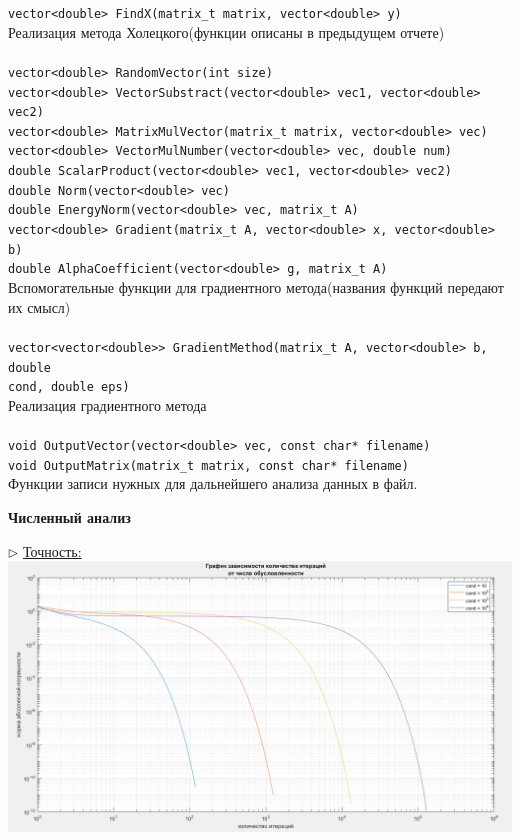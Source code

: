 \documentclass{article}
\begin{document}
	\verb|vector<double> FindX(matrix_t matrix, vector<double> y)|\\
	Реализация метода Холецкого(функции описаны в предыдущем отчете)\\
	\\
	\verb|vector<double> RandomVector(int size)|\\
	\verb|vector<double> VectorSubstract(vector<double> vec1, vector<double> vec2)|\\
	\verb|vector<double> MatrixMulVector(matrix_t matrix, vector<double> vec)|\\
	\verb|vector<double> VectorMulNumber(vector<double> vec, double num)|\\
	\verb|double ScalarProduct(vector<double> vec1, vector<double> vec2)|\\
	\verb|double Norm(vector<double> vec)|\\
	\verb|double EnergyNorm(vector<double> vec, matrix_t A)|\\
	\verb|vector<double> Gradient(matrix_t A, vector<double> x, vector<double> b)|\\
	\verb|double AlphaCoefficient(vector<double> g, matrix_t A)|\\
	Вспомогательные функции для градиентного метода(названия функций передают их смысл)\\
	\\
	\verb|vector<vector<double>> GradientMethod(matrix_t A, vector<double> b, double|\\ \verb|cond, double eps)|\\
	Реализация градиентного метода\\
	\\
	\verb|void OutputVector(vector<double> vec, const char* filename)|\\
	\verb|void OutputMatrix(matrix_t matrix, const char* filename)|\\
	Функции записи нужных для дальнейшего анализа данных в файл.
	\begin{center} \textbf{Численный анализ}\end{center}
	$\triangleright$ \underline{Точность:}\\
	\includegraphics[scale = 0.4]{Итерации}\\
\end{document}
